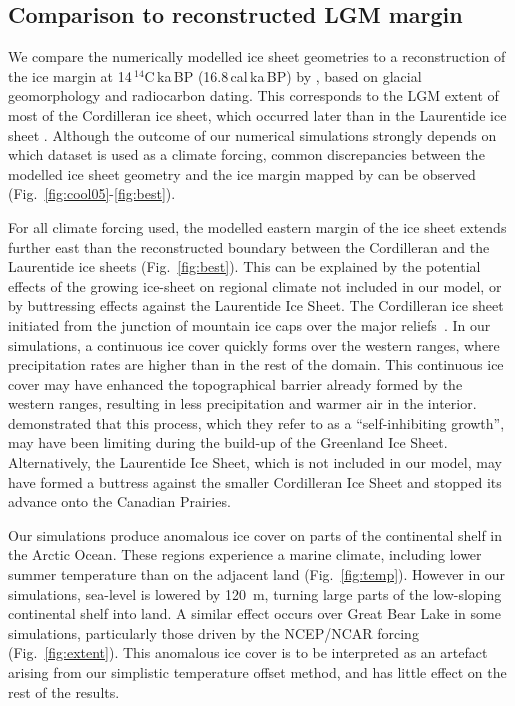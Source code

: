 \subsection{Comparison to reconstructed LGM margin}

We compare the numerically modelled ice sheet geometries to a reconstruction of the ice margin at 14\,$^{14}$C\,ka\,BP (16.8\,cal\,ka\,BP) by \citet{dyke-2004}, based on glacial geomorphology and radiocarbon dating. This corresponds to the LGM extent of most of the Cordilleran ice sheet, which occurred later than in the Laurentide ice sheet \citep{dyke-2004}.
Although the outcome of our numerical simulations strongly depends on which dataset is used as a climate forcing, common discrepancies between the modelled ice sheet geometry and the ice margin mapped by \citet{dyke-2004} can be observed (Fig.~\ref{fig:cool05}-\ref{fig:best}).

For all climate forcing used, the modelled eastern margin of the ice sheet extends further east than the reconstructed boundary between the Cordilleran and the Laurentide ice sheets (Fig.~\ref{fig:best}). This can be explained by the potential effects of the growing ice-sheet on regional climate not included in our model, or by buttressing effects against the Laurentide Ice Sheet. The Cordilleran ice sheet initiated from the junction of mountain ice caps over the major reliefs~\citep{clague-1989}. In our simulations, a continuous ice cover quickly forms over the western ranges, where precipitation rates are higher than in the rest of the domain. This continuous ice cover may have enhanced the topographical barrier already formed by the western ranges, resulting in less precipitation and warmer air in the interior. \citet{langen-etal-2012} demonstrated that this process, which they refer to as a ``self-inhibiting growth'', may have been limiting during the build-up of the Greenland Ice Sheet. Alternatively, the Laurentide Ice Sheet, which is not included in our model, may have formed a buttress against the smaller Cordilleran Ice Sheet and stopped its advance onto the Canadian Prairies.

Our simulations produce anomalous ice cover on parts of the continental shelf in the Arctic Ocean. These regions experience a marine climate, including lower summer temperature than on the adjacent land (Fig.~\ref{fig:temp}). However in our simulations, sea-level is lowered by 120~m, turning large parts of the low-sloping continental shelf into land. A similar effect occurs over Great Bear Lake in some simulations, particularly those driven by the NCEP/NCAR forcing (Fig.~\ref{fig:extent}). This anomalous ice cover is to be interpreted as an artefact arising from our simplistic temperature offset method, and has little effect on the rest of the results.

